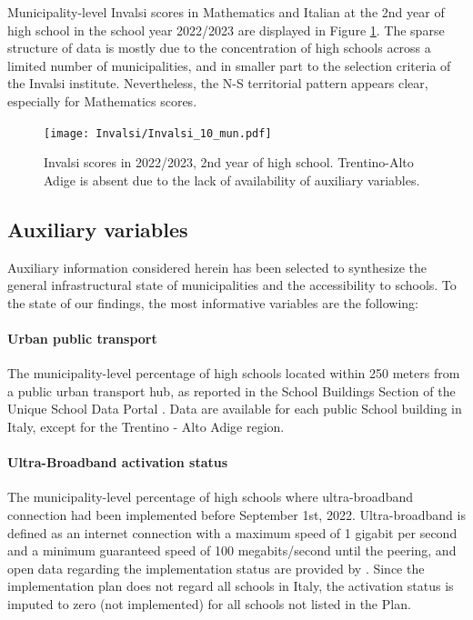 \documentclass[openany]{book}
\begin{document}
Municipality-level Invalsi scores in Mathematics and Italian at the 2nd year of high school in the school year 2022/2023 are displayed in Figure \ref{fig:Invalsi}. The sparse structure of data is mostly due to the concentration of high schools across a limited number of municipalities, and in smaller part to the selection criteria of the Invalsi institute. Nevertheless, the N-S territorial pattern appears clear, especially for Mathematics scores.

\begin{figure}
  \centering
  \texttt{[image: Invalsi/Invalsi\_10\_mun.pdf]} 
  \caption{Invalsi scores in 2022/2023, 2nd year of high school.  Trentino-Alto Adige is absent due to the lack of availability of auxiliary variables.}
  \label{fig:Invalsi}
\end{figure}

\subsection{Auxiliary variables}  \label{Covariates}
Auxiliary information considered herein has been selected to synthesize the general infrastructural state of municipalities and the accessibility to schools. To the state of our findings, the most informative variables are the following:
\paragraph{Urban public transport} The municipality-level percentage of high schools located within 250 meters from a public urban transport hub, as reported in the School Buildings Section of the Unique School Data Portal \citep{MIUR}. Data are available for each public School building in Italy, except for the Trentino - Alto Adige region.  
 
\paragraph{Ultra-Broadband activation status} The municipality-level percentage of high schools where ultra-broadband connection had been implemented before September 1st, 2022. Ultra-broadband is defined as an internet connection with a maximum speed of 1 gigabit per second and a minimum guaranteed speed of 100 megabits/second until the peering, and open data regarding the implementation status are provided by \cite{BB}. Since the implementation plan does not regard all schools in Italy, the activation status is imputed to zero (not implemented) for all schools not listed in the Plan.
\end{document}
